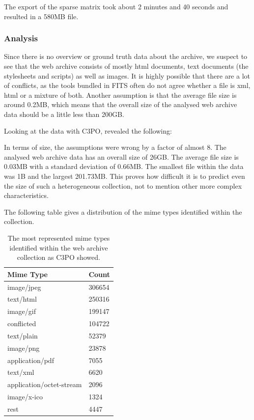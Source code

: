 The export of the sparse matrix took about 2 minutes and 40 seconds and resulted in a 580MB file.

\subsubsection{Analysis}
Since there is no overview or ground truth data about the archive, we suspect to see that the web archive consists of mostly html documents, text documents (the stylesheets and scripts) as well as images. It is highly possible that there are a lot of conflicts, as the tools bundled in FITS often do not agree whether a file is xml, html or a mixture of both.
Another assumption is that the average file size is around 0.2MB, which means that the overall size of the analysed web archive data should be a little less than 200GB.

Looking at the data with C3PO, revealed the following:

In terms of size, the assumptions were wrong by a factor of almost 8. The analysed web archive data has an overall size of  26GB. The average file size is 0.03MB with a standard deviation of 0.66MB. The smallest file within the data was 1B and the largest 201.73MB. This proves how difficult it is to predict even the size of such a heterogeneous collection, not to mention other more complex characteristics.

The following table gives a distribution of the mime types identified within the collection.

\begin{table}[h]
\centering
\begin{tabular}{l || l }
\hline
Mime Type & Count \\
\hline
\hline
 image/jpeg & 306654 \\
 text/html 	& 250316 \\
 image/gif		&  199147 \\
 conflicted	&  104722 \\
 text/plain		& 52379 \\
 image/png & 23878 \\
 application/pdf & 7055 \\
 text/xml		& 6620\\
 application/octet-stream & 2096 \\
 image/x-ico	& 1324\\
 rest			& 4447\\
 \hline
\end{tabular}
\caption{The most represented mime types identified within the web archive collection as C3PO showed.}
\label{tab:webarchive_mimetypes}
\end{table}

